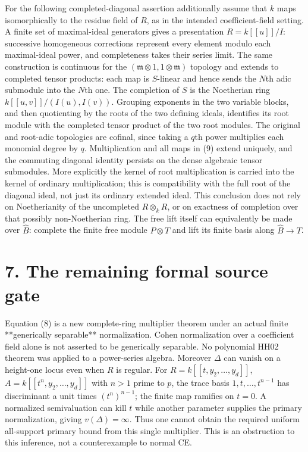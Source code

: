 \documentclass[11pt]{article}
\begin{document}
For the following completed-diagonal assertion additionally assume that $k$ maps isomorphically to the residue field of $R$, as in the intended coefficient-field setting. A finite set of maximal-ideal generators gives a presentation $R=k[[u]]/I$: successive homogeneous corrections represent every element modulo each maximal-ideal power, and completeness takes their series limit. The same construction is continuous for the $(\mathfrak m\otimes1,1\otimes\mathfrak m)$ topology and extends to completed tensor products: each map is $S$-linear and hence sends the $N$th adic submodule into the $N$th one. The completion of $S$ is the Noetherian ring $k[[u,v]]/(I(u),I(v))$. Grouping exponents in the two variable blocks, and then quotienting by the roots of the two defining ideals, identifies its root module with the completed tensor product of the two root modules. The original and root-adic topologies are cofinal, since taking a $q$th power multiplies each monomial degree by $q$. Multiplication and all maps in (9) extend uniquely, and the commuting diagonal identity persists on the dense algebraic tensor submodules. More explicitly the kernel of root multiplication is carried into the kernel of ordinary multiplication; this is compatibility with the full root of the diagonal ideal, not just its ordinary extended ideal. This conclusion does not rely on Noetherianity of the uncompleted $R\otimes_kR$, or on exactness of completion over that possibly non-Noetherian ring. The free lift itself can equivalently be made over $\widehat B$: complete the finite free module $P\otimes T$ and lift its finite basis along $\widehat B\to T$.

\section{7. The remaining formal source gate}

Equation (8) is a new complete-ring multiplier theorem under an actual finite **generically separable** normalization. Cohen normalization over a coefficient field alone is not asserted to be generically separable. No polynomial HH02 theorem was applied to a power-series algebra. Moreover $\Delta$ can vanish on a height-one locus even when $R$ is regular. For $R=k[[t,y_2,\ldots,y_d]]$, $A=k[[t^n,y_2,\ldots,y_d]]$ with $n>1$ prime to $p$, the trace basis $1,t,\ldots,t^{n-1}$ has discriminant a unit times $(t^n)^{n-1}$; the finite map ramifies on $t=0$. A normalized semivaluation can kill $t$ while another parameter supplies the primary normalization, giving $v(\Delta)=\infty$. Thus one cannot obtain the required uniform all-support primary bound from this single multiplier. This is an obstruction to this inference, not a counterexample to normal CE.
\end{document}
